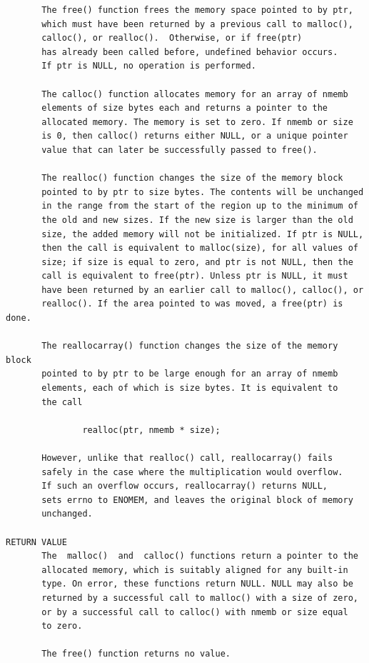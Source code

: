{\begin{center}
\begin{verbatim}
       The free() function frees the memory space pointed to by ptr,
       which must have been returned by a previous call to malloc(),
       calloc(), or realloc().  Otherwise, or if free(ptr)     
       has already been called before, undefined behavior occurs.
       If ptr is NULL, no operation is performed.

       The calloc() function allocates memory for an array of nmemb
       elements of size bytes each and returns a pointer to the
       allocated memory. The memory is set to zero. If nmemb or size
       is 0, then calloc() returns either NULL, or a unique pointer
       value that can later be successfully passed to free().

       The realloc() function changes the size of the memory block
       pointed to by ptr to size bytes. The contents will be unchanged
       in the range from the start of the region up to the minimum of
       the old and new sizes. If the new size is larger than the old
       size, the added memory will not be initialized. If ptr is NULL,
       then the call is equivalent to malloc(size), for all values of
       size; if size is equal to zero, and ptr is not NULL, then the
       call is equivalent to free(ptr). Unless ptr is NULL, it must
       have been returned by an earlier call to malloc(), calloc(), or
       realloc(). If the area pointed to was moved, a free(ptr) is done.

       The reallocarray() function changes the size of the memory block
       pointed to by ptr to be large enough for an array of nmemb
       elements, each of which is size bytes. It is equivalent to
       the call

               realloc(ptr, nmemb * size);

       However, unlike that realloc() call, reallocarray() fails
       safely in the case where the multiplication would overflow.
       If such an overflow occurs, reallocarray() returns NULL,
       sets errno to ENOMEM, and leaves the original block of memory
       unchanged.

RETURN VALUE
       The  malloc()  and  calloc() functions return a pointer to the
       allocated memory, which is suitably aligned for any built-in
       type. On error, these functions return NULL. NULL may also be
       returned by a successful call to malloc() with a size of zero,
       or by a successful call to calloc() with nmemb or size equal
       to zero.

       The free() function returns no value.


\end{verbatim}
\end{center}}
